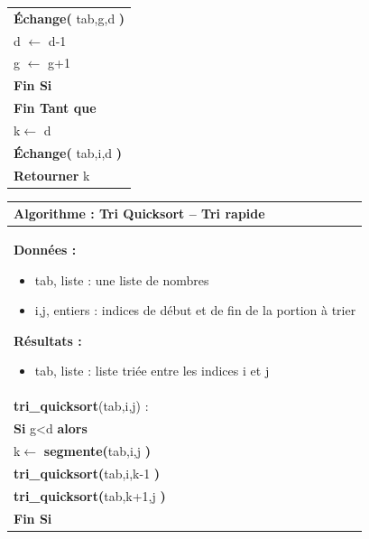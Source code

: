 \documentclass[10pt]{article}
\begin{document}
\begin{pseudo}
\begin{center}
\begin{tabular}{p{}}
\hspace{1.2cm} \textbf{Échange(} \textsf{tab,g,d} \textbf{)} \\
\hspace{1.2cm} \textsf{d $\leftarrow$ d-1}\\  
\hspace{1.2cm} \textsf{g $\leftarrow$ g+1}\\  
\hspace{.8cm} \textbf{Fin Si} \\
\hspace{.4cm} \textbf{Fin Tant que}  \\
\hspace{.4cm} \textsf{k$\leftarrow$ d}  \\
\hspace{.4cm} \textbf{Échange(} \textsf{tab,i,d} \textbf{)} \\
\hspace{.4cm} \textbf{Retourner} \textsf{k}  \\
\hline
\end{tabular}
\end{center}


\begin{center}
\begin{tabular}{p{}}
\hline
\textbf{Algorithme :} Tri Quicksort -- Tri rapide\\
\hline
\textbf{Données :}
\begin{itemize}
\item \textsf{tab}, liste : une liste de nombres
\item \textsf{i,j}, entiers : indices de début et de fin de la portion à trier
\end{itemize}
\textbf{Résultats :} 
\begin{itemize}
\item \textsf{tab}, liste : liste triée entre les indices \textsf{i} et \textsf{j}
\end{itemize}
\\
\textbf{tri\_quicksort}(\textsf{tab,i,j}) :\\
\hspace{.4cm} \textbf{Si} \textsf{g<d} \textbf{alors} \\
\hspace{.8cm} \textsf{k$\leftarrow$} \textbf{segmente(}\textsf{tab,i,j} \textbf{)} \\
\hspace{.8cm} \textbf{tri\_quicksort(}\textsf{tab,i,k-1} \textbf{)} \\
\hspace{.8cm} \textbf{tri\_quicksort(}\textsf{tab,k+1,j} \textbf{)} \\
\hspace{.4cm} \textbf{Fin Si} \\
\hline
\end{tabular}
\end{center}
\end{pseudo}
\end{document}
